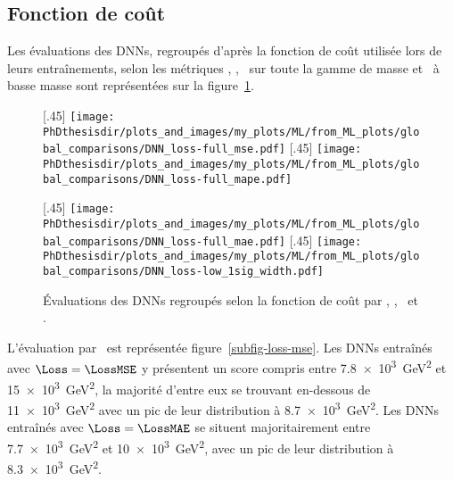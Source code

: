 \subsection{Fonction de coût}\label{chapter-ML-section-hyperparameters-loss}
Les évaluations des DNNs,
regroupés d'après la fonction de coût utilisée lors de leurs entraînements,
selon les métriques
\LossMSE, \LossMAPE, \LossMAE\ sur toute la gamme de masse et \OneSigmaWidth\ à basse masse
sont représentées sur la figure~\ref{fig-DNN_losses}.
\begin{figure}[h]
\centering

\subcaptionbox{\label{subfig-loss-mse}}[.45\textwidth]
{\texttt{[image: \\PhDthesisdir/plots\_and\_images/my\_plots/ML/from\_ML\_plots/global\_comparisons/DNN\_loss-full\_mse.pdf]}\vspace{-\baselineskip}}
\hfill
\subcaptionbox{\label{subfig-loss-mape}}[.45\textwidth]
{\texttt{[image: \\PhDthesisdir/plots\_and\_images/my\_plots/ML/from\_ML\_plots/global\_comparisons/DNN\_loss-full\_mape.pdf]}\vspace{-\baselineskip}}

\vspace{\baselineskip}

\subcaptionbox{\label{subfig-loss-mae}}[.45\textwidth]
{\texttt{[image: \\PhDthesisdir/plots\_and\_images/my\_plots/ML/from\_ML\_plots/global\_comparisons/DNN\_loss-full\_mae.pdf]}\vspace{-\baselineskip}}
\hfill
\subcaptionbox{\label{subfig-loss-low_1sigma}}[.45\textwidth]
{\texttt{[image: \\PhDthesisdir/plots\_and\_images/my\_plots/ML/from\_ML\_plots/global\_comparisons/DNN\_loss-low\_1sig\_width.pdf]}\vspace{-\baselineskip}}

\caption[Évaluations des DNNs regroupés selon la fonction de coût.]{Évaluations des DNNs regroupés selon la fonction de coût par \LossMSE, \LossMAPE, \LossMAE\ et \OneSigmaWidth.}
\label{fig-DNN_losses}
\end{figure}
\par
L'évaluation par \LossMSE\ est représentée figure~\ref{subfig-loss-mse}.
Les DNNs entraînés avec $\Loss=\LossMSE$
y présentent un score
compris entre \SI{7.8e3}{\GeV^2} et \SI{15e3}{\GeV^2},
la majorité d'entre eux se trouvant en-dessous de \SI{11e3}{\GeV^2}
avec un pic de leur distribution à \SI{8.7e3}{\GeV^2}.
Les DNNs entraînés avec $\Loss=\LossMAE$
se situent majoritairement
entre \SI{7.7e3}{\GeV^2} et \SI{10e3}{\GeV^2},
avec un pic de leur distribution à \SI{8.3e3}{\GeV^2}.
